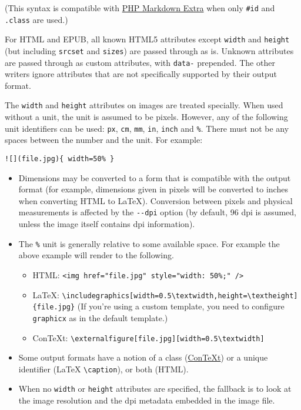 \documentclass[
]{article}
\providecommand{\tightlist}{%
  \setlength{\itemsep}{0pt}\setlength{\parskip}{0pt}}
\begin{document}
(This syntax is compatible with
\href{https://michelf.ca/projects/php-markdown/extra/}{PHP Markdown
Extra} when only \texttt{\#id} and \texttt{.class} are used.)

For HTML and EPUB, all known HTML5 attributes except \texttt{width} and
\texttt{height} (but including \texttt{srcset} and \texttt{sizes}) are
passed through as is. Unknown attributes are passed through as custom
attributes, with \texttt{data-} prepended. The other writers ignore
attributes that are not specifically supported by their output format.

The \texttt{width} and \texttt{height} attributes on images are treated
specially. When used without a unit, the unit is assumed to be pixels.
However, any of the following unit identifiers can be used: \texttt{px},
\texttt{cm}, \texttt{mm}, \texttt{in}, \texttt{inch} and \texttt{\%}.
There must not be any spaces between the number and the unit. For
example:

\begin{verbatim}
![](file.jpg){ width=50% }
\end{verbatim}

\begin{itemize}
\tightlist
\item
  Dimensions may be converted to a form that is compatible with the
  output format (for example, dimensions given in pixels will be
  converted to inches when converting HTML to LaTeX). Conversion between
  pixels and physical measurements is affected by the \texttt{-\/-dpi}
  option (by default, 96 dpi is assumed, unless the image itself
  contains dpi information).
\item
  The \texttt{\%} unit is generally relative to some available space.
  For example the above example will render to the following.

  \begin{itemize}
  \tightlist
  \item
    HTML:
    \texttt{\textless{}img\ href="file.jpg"\ style="width:\ 50\%;"\ /\textgreater{}}
  \item
    LaTeX:
    \texttt{\textbackslash{}includegraphics{[}width=0.5\textbackslash{}textwidth,height=\textbackslash{}textheight{]}\{file.jpg\}}
    (If you're using a custom template, you need to configure
    \texttt{graphicx} as in the default template.)
  \item
    ConTeXt:
    \texttt{\textbackslash{}externalfigure{[}file.jpg{]}{[}width=0.5\textbackslash{}textwidth{]}}
  \end{itemize}
\item
  Some output formats have a notion of a class
  (\href{https://wiki.contextgarden.net/Using_Graphics\#Multiple_Image_Settings}{ConTeXt})
  or a unique identifier (LaTeX \texttt{\textbackslash{}caption}), or
  both (HTML).
\item
  When no \texttt{width} or \texttt{height} attributes are specified,
  the fallback is to look at the image resolution and the dpi metadata
  embedded in the image file.
\end{itemize}
\end{document}
